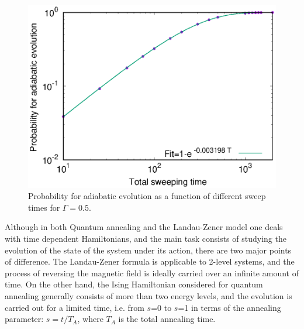 \documentclass[../main.tex]{subfiles}
\begin{document}
\begin{figure}[H]
\centering 
\includegraphics[scale=0.8]{Prob_1spin_H100.eps}
\caption{Probability for adiabatic evolution as a function of different sweep times for $\Gamma=0.5$.}
\label{fig:lz3}
\end{figure}


Although in both Quantum annealing and the Landau-Zener model one deals with time dependent Hamiltonians, and the main task consists of studying the evolution of the state of the system under its action, there are two major points of difference. The Landau-Zener formula is applicable to 2-level systems, and the process of reversing the magnetic field is ideally carried over an infinite amount of time. On the other hand, the Ising Hamiltonian considered for quantum annealing generally consists of more than two energy levels, and the evolution is carried out for a limited time, i.e. from $s$=0 to $s$=1 in terms of the annealing parameter: $s=t/T_A$, where $T_A$ is the total annealing time.
\end{document}
